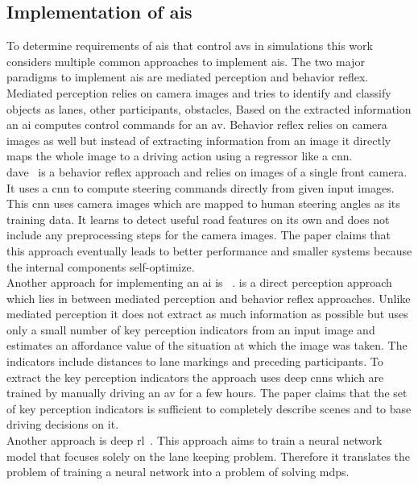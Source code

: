 \subsection{Implementation of \texorpdfstring{\glspl{ai}}{AI}}
To determine requirements of \glspl{ai} that control \glspl{av} in simulations this work considers multiple common approaches to implement \glspl{ai}.
The two major paradigms to implement \glspl{ai} are mediated perception and behavior reflex.
Mediated perception relies on camera images and tries to identify and classify objects as lanes, other participants, obstacles, \etc{}
Based on the extracted information an \gls{ai} computes control commands for an \gls{av}.
Behavior reflex relies on camera images as well but instead of extracting information from an image it directly maps the whole image to a driving action using a regressor like a \gls{cnn}.\\
\Gls{dave}~\cite{dave} is a behavior reflex approach and relies on images of a single front camera.
It uses a \gls{cnn} to compute steering commands directly from given input images.
This \gls{cnn} uses camera images which are mapped to human steering angles as its training data.
It learns to detect useful road features on its own and does not include any preprocessing steps for the camera images.
The paper claims that this approach eventually leads to better performance and smaller systems because the internal components self-optimize.\\
Another approach for implementing an \gls{ai} is \deepdriving{}~\cite{deepDriving}.
\deepdriving{} is a direct perception approach which lies in between mediated perception and behavior reflex approaches.
Unlike mediated perception it does not extract as much information as possible but uses only a small number of key perception indicators from an input image and estimates an affordance value of the situation at which the image was taken.
The indicators include distances to lane markings and preceding participants.
To extract the key perception indicators the approach uses deep \glspl{cnn} which are trained by manually driving an \gls{av} for a few hours.
The paper claims that the set of key perception indicators is sufficient to completely describe scenes and to base driving decisions on it.\\
Another approach is deep \gls{rl}~\cite{learnToDriveInADay}.
This approach aims to train a neural network model that focuses solely on the lane keeping problem.
Therefore it translates the problem of training a neural network into a problem of solving \glspl{mdp}.
